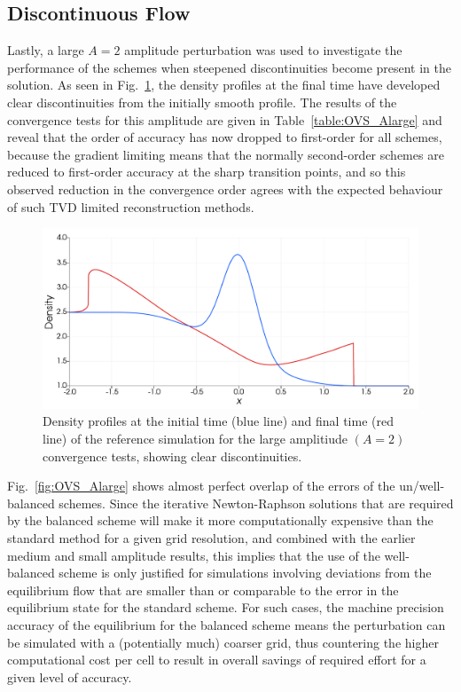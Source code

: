 \subsection{Discontinuous Flow}

Lastly, a large $A=2$ amplitude perturbation was used to investigate the performance of the schemes when steepened discontinuities become present in the solution. As seen in Fig.~\ref{fig:OVS_Alarge_profile}, the density profiles at the final time have developed clear discontinuities from the initially smooth profile. The results of the convergence tests for this amplitude are given in Table~\ref{table:OVS_Alarge} and reveal that the order of accuracy has now dropped to first-order for all schemes, because the gradient limiting means that the normally second-order schemes are reduced to first-order accuracy at the sharp transition points, and so this observed reduction in the convergence order agrees with the expected behaviour of such TVD limited reconstruction methods.

\begin {figure}
\centering
\includegraphics[width=13cm]{figures/OVSeps2profile}
\caption {Density profiles at the initial time (blue line) and final time (red line) of the reference simulation for the large amplitiude $(A=2)$ convergence tests, showing clear discontinuities.}
\label{fig:OVS_Alarge_profile}
\end{figure}

Fig.~\ref{fig:OVS_Alarge} shows almost perfect overlap of the errors of the un/well-balanced schemes. Since the iterative Newton-Raphson solutions that are required by the balanced scheme will make it more computationally expensive than the standard method for a given grid resolution, and combined with the earlier medium and small amplitude results, this implies that the use of the well-balanced scheme is only justified for simulations involving deviations from the equilibrium flow that are smaller than or comparable to the error in the equilibrium state for the standard scheme. For such cases, the machine precision accuracy of the equilibrium for the balanced scheme means the perturbation can be simulated with a (potentially much) coarser grid, thus countering the higher computational cost per cell to result in overall savings of required effort for a given level of accuracy.

